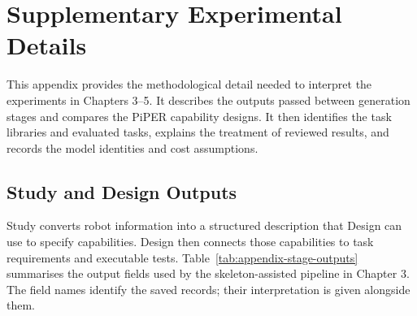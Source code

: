 \chapter{Supplementary Experimental Details}
\label{chap:appendix}

This appendix provides the methodological detail needed to interpret the
experiments in Chapters 3--5. It describes the outputs passed between
generation stages and compares the PiPER capability designs. It then
identifies the task libraries and evaluated tasks, explains the treatment of
reviewed results, and records the model identities and cost assumptions.

\section{Study and Design Outputs}
\label{sec:appendix-stage-outputs}

Study converts robot information into a structured description that Design
can use to specify capabilities. Design then connects those capabilities to
task requirements and executable tests.
Table~\ref{tab:appendix-stage-outputs} summarises the output fields used by
the skeleton-assisted pipeline in Chapter 3. The field names identify the
saved records; their interpretation is given alongside them.

